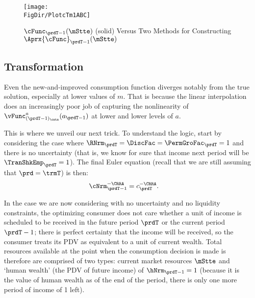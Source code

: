 \documentclass[\econtexRoot/SolvingMicroDSOPs]{subfiles}
\begin{document}
\hypertarget{PlotcTm1ABC}{}
\begin{figure}
  \centerline{\texttt{[image: \\FigDir/PlotcTm1ABC]}}
  \caption{$\cFunc_{\prdT-1}(\mStte)$ (solid) Versus Two Methods for Constructing $\Aprx{\cFunc}_{\prdT-1}(\mStte)$}
  \label{fig:PlotcTm1ABC}
\end{figure}

\hypertarget{transformation}{}
\subsection{Transformation}\label{subsec:transformation}

Even the new-and-improved consumption function diverges notably from the true
solution, especially at lower values of $m$.  That is because the
linear interpolation does an increasingly poor job of capturing the
nonlinearity of $\vFunc_{({\prdT-1})_\cntn}^{a}(a_{\prdT-1})$ at
lower and lower levels of $a$.

This is where we unveil our next trick.  To understand the logic,
start by considering the case where $\RNrm_{\prdT} = \DiscFac =
\PermGroFac_{\prdT} = 1$ and there is no uncertainty
 (that is, we know for sure that income next period
will be $\TranShkEmp_{\prdT} = 1$).  The final Euler equation (recall that we are still assuming that $\prd=\trmT$) is then:
\begin{equation}\begin{gathered}\begin{aligned}
      \cNrm_{\prdT-1}^{-\CRRA}  & = c_{\prdT}^{-\CRRA}.
    \end{aligned}\end{gathered}\end{equation}

In the case we are now considering with no uncertainty and no liquidity constraints, the optimizing consumer does not care whether a unit of income is scheduled to be received in the future period $\prdT$ or the current period $\prdT-1$; there is perfect certainty that the income will be received, so the consumer treats its PDV as equivalent to a unit of current wealth.  Total resources available at the point when the consumption decision is made is therefore are comprised of two types: current market resources $\mStte$ and `human wealth' (the PDV of future income) of $\hNrm_{\prdT-1}=1$ (because it is the value of human wealth as of the end of the period, there is only one more period of income of 1 left).
\end{document}
